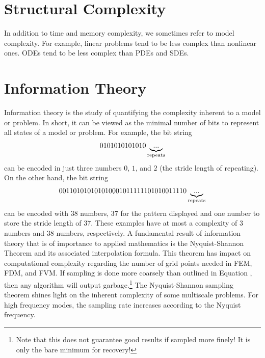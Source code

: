 \section{Structural Complexity}
In addition to time and memory complexity, we sometimes refer to model complexity. For example, linear problems tend to be less complex than nonlinear ones. ODEs tend to be less complex than PDEs and SDEs. 

\section{Information Theory}
Information theory is the study of quantifying the complexity inherent to a model or problem. In short, it can be viewed as the minimal number of bits to represent all states of a model or problem. For example, the bit string 
\begin{align} \label{eqn:18:simpleprogram}
    0101010101010\underbrace{...}_{\textup{repeats}}
\end{align}
can be encoded in just three numbers $0$, $1$, and $2$ (the stride length of repeating). On the other hand, the bit string 
\begin{align} \label{eqn:18:complexprogram}
    001101010101010001011111101010011110\underbrace{...}_{\textup{repeats}}
\end{align}
can be encoded with $38$ numbers, $37$ for the pattern displayed and one number to store the stride length of $37$. 
These examples have at most a complexity of $3$ numbers and $38$ numbers, respectively.
A fundamental result of information theory that is of importance to applied mathematics is the Nyquist-Shannon Theorem and its associated interpolation formula.
This theorem has impact on computational complexity regarding the number of grid points needed in FEM, FDM, and FVM. If sampling is done more coarsely than outlined in Equation , then any algorithm will output garbage.\footnote{Note that this does not guarantee good results if sampled more finely! It is only the bare minimum for recovery!} The Nyquist-Shannon sampling theorem shines light on the inherent complexity of some multiscale problems. For high frequency modes, the sampling rate increases according to the Nyquist frequency.

